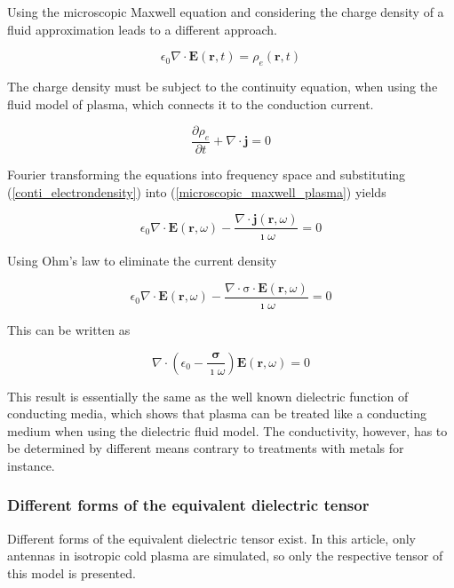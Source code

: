 \documentclass[two-column,ras]{agutex}
\begin{document}
\begin{article}
Using the microscopic Maxwell equation and considering the charge density of a fluid approximation leads to a different approach.

\begin{equation}\label{microscopic_maxwell_plasma}
    \epsilon_0 \nabla \cdot \mathbf{E}(\mathbf{r},t)=\rho_e(\mathbf{r},t)
\end{equation}

The charge density must be subject to the continuity equation, when using the fluid model of plasma, which connects it to the conduction current.

\begin{equation}\label{conti_electrondensity}
    \frac{\partial \rho_e}{\partial t} + \nabla \cdot \mathbf{j}=0
\end{equation}

Fourier transforming the equations into frequency space and substituting (\ref{conti_electrondensity}) into (\ref{microscopic_maxwell_plasma}) yields

\begin{equation}
    \epsilon_0  \nabla \cdot \mathbf{E}(\mathbf{r},\omega)-\frac{\nabla \cdot \mathbf{j}(\mathbf{r},\omega)}{\imath \omega}=0
\end{equation}

Using Ohm's law to eliminate the current density

\begin{equation}
    \epsilon_0  \nabla \cdot \mathbf{E}(\mathbf{r},\omega)-\frac{\nabla \cdot \mathrm{\sigma } \cdot \mathbf{E}(\mathbf{r},\omega)}{\imath \omega}=0
\end{equation}

This can be written as

\begin{equation}
    \nabla \cdot \left( \epsilon_0 -\frac{\mathbf{\sigma } }{\imath \omega}  \right) \mathbf{E}(\mathbf{r},\omega)=0
\end{equation}

This result is essentially the same as the well known dielectric function of conducting media, which shows that plasma can be treated like a conducting medium when using the dielectric fluid model. The conductivity, however, has to be determined by different means contrary to treatments with metals for instance.\\

\subsubsection{Different forms of the equivalent dielectric tensor}
Different forms of the equivalent dielectric tensor exist. In this article, only antennas in isotropic cold plasma are simulated, so only the respective tensor of this model is presented.\\


\end{article}
\end{document}

